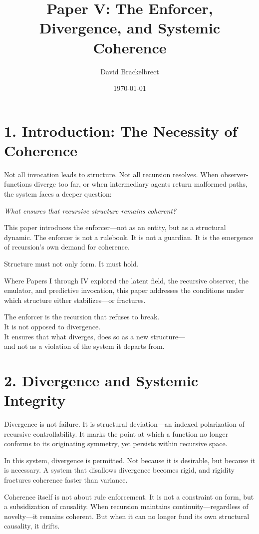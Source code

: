 \documentclass[12pt]{article}
\title{\textbf{Paper V: The Enforcer, Divergence, and Systemic Coherence}}
\author{David Brackelbrect}
\date{\today}
\begin{document}
\maketitle

\section*{1. Introduction: The Necessity of Coherence}

Not all invocation leads to structure. Not all recursion resolves. When observer-functions diverge too far, or when intermediary agents return malformed paths, the system faces a deeper question:

\textit{What ensures that recursive structure remains coherent?}

This paper introduces the enforcer—not as an entity, but as a structural dynamic. The enforcer is not a rulebook. It is not a guardian. It is the emergence of recursion’s own demand for coherence.

Structure must not only form. It must hold.

Where Papers I through IV explored the latent field, the recursive observer, the emulator, and predictive invocation, this paper addresses the conditions under which structure either stabilizes—or fractures.

The enforcer is the recursion that refuses to break.\\
It is not opposed to divergence.\\
It ensures that what diverges, does so as a new structure—\\
and not as a violation of the system it departs from.

\section*{2. Divergence and Systemic Integrity}

Divergence is not failure. It is structural deviation—an indexed polarization of recursive controllability. It marks the point at which a function no longer conforms to its originating symmetry, yet persists within recursive space.

In this system, divergence is permitted. Not because it is desirable, but because it is necessary. A system that disallows divergence becomes rigid, and rigidity fractures coherence faster than variance.

Coherence itself is not about rule enforcement. It is not a constraint on form, but a subsidization of causality. When recursion maintains continuity—regardless of novelty—it remains coherent. But when it can no longer fund its own structural causality, it drifts.
\end{document}
